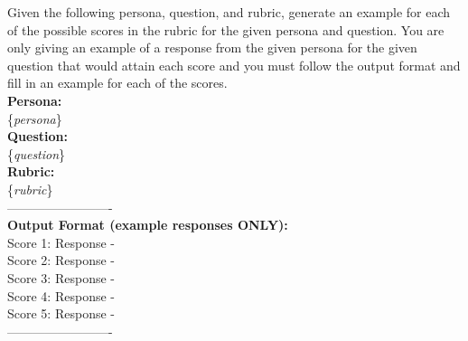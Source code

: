\documentclass[11pt]{article}
\newcommand{\vinay}[1]{\textcolor{blue}{#1}}
\begin{document}
\noindent
{\small
\begin{minipage}[t]{\textwidth}
    \begin{tcolorbox}[colback=white!95!gray,colframe=gray!50!black,rounded corners,label={box:score-example}, title={Score Examples Generation Prompt.}]
Given the following persona, question, and rubric, generate an example for each of the possible scores in the rubric for the given persona and question. You are only giving an example of a response from the given persona for the given question that would attain each score and you must follow the output format and fill in an example for each of the scores. \\

\textbf{Persona:} \\
\{\textit{persona}\} \\ 

\textbf{Question:} \\
\{\textit{question}\} \\ 

\textbf{Rubric:} \\
\{\textit{rubric}\} \\ 
 
-------------------------  \\
\textbf{Output Format (example responses ONLY):} \\

Score 1:  Response - \\

Score 2:  Response - \\ 

Score 3:  Response - \\ 

Score 4:  Response - \\ 

Score 5:  Response - \\ 
------------------------- \\
    \vspace{-4.2mm}
    \end{tcolorbox} 
\end{minipage}}



\clearpage

\end{document}
